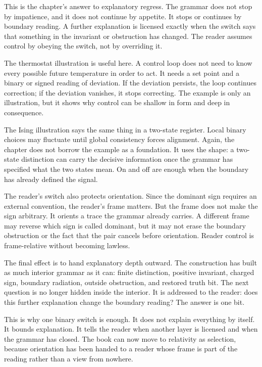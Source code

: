 This is the chapter's answer to explanatory regress. The grammar does not
stop by impatience, and it does not continue by appetite. It stops or
continues by boundary reading. A further explanation is licensed exactly when
the switch says that something in the invariant or obstruction has changed.
The reader assumes control by obeying the switch, not by overriding it.

The thermostat illustration is useful here. A control loop does not need to
know every possible future temperature in order to act. It needs a set point
and a binary or signed reading of deviation. If the deviation persists, the
loop continues correction; if the deviation vanishes, it stops correcting.
The example is only an illustration, but it shows why control can be shallow
in form and deep in consequence.

The Ising illustration says the same thing in a two-state register. Local
binary choices may fluctuate until global consistency forces alignment.
Again, the chapter does not borrow the example as a foundation. It uses the
shape: a two-state distinction can carry the decisive information once the
grammar has specified what the two states mean. On and off are enough when
the boundary has already defined the signal.

The reader's switch also protects orientation. Since the dominant sign
requires an external convention, the reader's frame matters. But the frame
does not make the sign arbitrary. It orients a trace the grammar already
carries. A different frame may reverse which sign is called dominant, but it
may not erase the boundary obstruction or the fact that the pair cancels
before orientation. Reader control is frame-relative without becoming
lawless.

The final effect is to hand explanatory depth outward. The construction has
built as much interior grammar as it can: finite distinction, positive
invariant, charged sign, boundary radiation, outside obstruction, and
restored truth bit. The next question is no longer hidden inside the
interior. It is addressed to the reader: does this further explanation
change the boundary reading? The answer is one bit.

This is why one binary switch is enough. It does not explain everything by
itself. It bounds explanation. It tells the reader when another layer is
licensed and when the grammar has closed. The book can now move to
relativity as selection, because orientation has been handed to a reader
whose frame is part of the reading rather than a view from nowhere.


